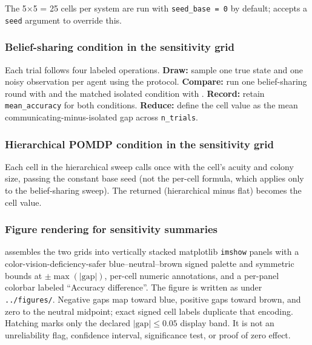 \documentclass[
  english,
]{article}
\theoremstyle{plain}
\theoremstyle{definition}
\theoremstyle{remark}
\theoremstyle{definition}
\begin{document}
The 5\texorpdfstring{\ensuremath{\times}}{x}5 = 25 cells per system are run with \texttt{seed\_base\ =\ 0} by
default;  accepts a \texttt{seed}
argument to override this.

\subsubsection{Belief-sharing condition in the sensitivity
grid}\label{belief-sharing-condition-in-the-sensitivity-grid}

Each trial follows four labeled operations. \textbf{Draw:} sample one
true state and one noisy observation per agent using the
 protocol. \textbf{Compare:} run one
belief-sharing round with  and the matched
isolated condition with . \textbf{Record:}
retain \texttt{mean\_accuracy} for both conditions. \textbf{Reduce:}
define the cell value as the mean communicating-minus-isolated gap
across \texttt{n\_trials}.

\subsubsection{Hierarchical POMDP condition in the sensitivity
grid}\label{hierarchical-pomdp-condition-in-the-sensitivity-grid}

Each cell in the hierarchical sweep calls
 once with the cell's acuity and colony
size, passing the constant base seed (not the per-cell formula, which
applies only to the belief-sharing sweep). The returned
 (hierarchical minus flat) becomes the
cell value.

\subsubsection{Figure rendering for sensitivity
summaries}\label{figure-rendering-for-sensitivity-summaries}

 assembles the two grids into
vertically stacked matplotlib \texttt{imshow} panels with a
color-vision-deficiency-safer blue--neutral--brown signed palette and
symmetric bounds at \(\pm\max(|\text{gap}|)\), per-cell numeric
annotations, and a per-panel colorbar labeled ``Accuracy difference''.
The figure is written as  under
\texttt{../figures/}. Negative gaps map toward blue, positive gaps
toward brown, and zero to the neutral midpoint; exact signed cell labels
duplicate that encoding. Hatching marks only the declared
\(|\mathrm{gap}| \le 0.05\) display band. It is not an unreliability
flag, confidence interval, significance test, or proof of zero effect.
\end{document}
